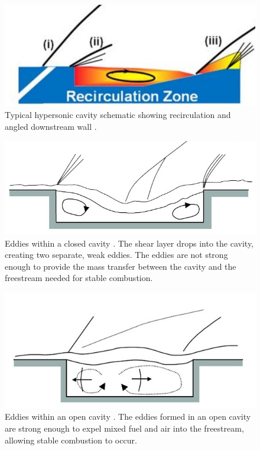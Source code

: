 \begin{figure}
\centering
\includegraphics[width = \textwidth]{Figures/Angled.jpg}
\caption[Diagram of typical cavity showing recirculation]{Typical hypersonic cavity schematic showing recirculation and angled downstream wall \cite{do2009plasma}.}
\label{fig:angled}
\end{figure}

\clearpage

\begin{figure}
\centering
\includegraphics[width = \textwidth]{Figures/ClosedCav.jpg}
\caption[Eddies within a closed cavity]{Eddies within a closed cavity \cite{ben2000experimental}. The shear layer drops into the cavity, creating two separate, weak eddies. The eddies are not strong enough to provide the mass transfer between the cavity and the freestream needed for stable combustion.}
\label{fig:Closed}
\end{figure}

\begin{figure}
\centering
\includegraphics[width=\textwidth]{Figures/OpenCav.jpg}
\caption[Eddies within an open cavity]{Eddies within an open cavity \cite{ben2000experimental}. The eddies formed in an open cavity are strong enough to expel mixed fuel and air into the freestream, allowing stable combustion to occur.}
\label{fig:Open}
\end{figure}


